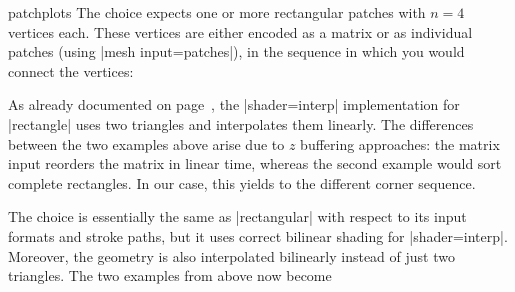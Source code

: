 {\begin{pgfplotslibrary}{patchplots}
The choice  expects one or more rectangular patches with
$n=4$ vertices each. These vertices are either encoded as a matrix or as
individual patches (using |mesh input=patches|), in the sequence in which you
would connect the vertices:
%
\begin{codeexample}[]
\end{codeexample}

\begin{codeexample}[]
\end{codeexample}
%
\noindent As already documented on page~\pageref{key:patch:type}, the
|shader=interp| implementation for |rectangle| uses two triangles and
interpolates them linearly. The differences between the two examples above
arise due to $z$ buffering approaches: the matrix input reorders the matrix in
linear time, whereas the second example would sort complete rectangles. In our
case, this yields to the different corner sequence.

The choice  is essentially the same as |rectangular|
with respect to its input formats and stroke paths, but it uses correct
bilinear shading for |shader=interp|. Moreover, the geometry is also
interpolated bilinearly instead of just two triangles. The two examples from
above now become
%
\begin{codeexample}[]
\end{codeexample}


\end{pgfplotslibrary}}
